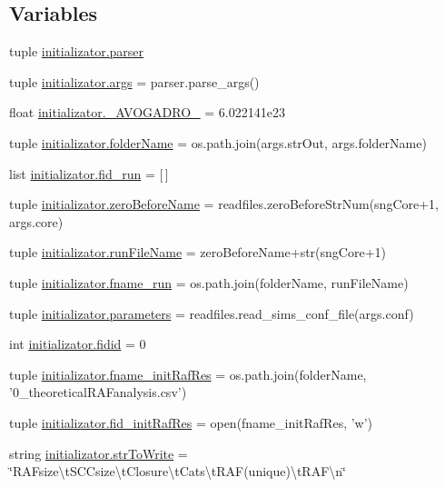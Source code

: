 \subsection*{Variables}
\begin{DoxyCompactItemize}
\item 
tuple \hyperlink{a00135_af2659789ba1896029e3ab9bfbf83d019}{initializator.\-parser}
\item 
tuple \hyperlink{a00135_aedb2e5b77a354ccd69d9d38b3c30f61a}{initializator.\-args} = parser.\-parse\-\_\-args()
\item 
float \hyperlink{a00135_a01b3b6a0972397f230c35bd2fb8effc4}{initializator.\-\_\-\-A\-V\-O\-G\-A\-D\-R\-O\-\_\-} = 6.\-022141e23
\item 
tuple \hyperlink{a00135_aa51c106700ef9afbdb94a1c800e10569}{initializator.\-folder\-Name} = os.\-path.\-join(args.\-str\-Out, args.\-folder\-Name)
\item 
list \hyperlink{a00135_a6015a676cc06fdae98b1cca15d92b883}{initializator.\-fid\-\_\-run} = \mbox{[}$\,$\mbox{]}
\item 
tuple \hyperlink{a00135_a475e51ace78f2490aa4206915d0e3ae6}{initializator.\-zero\-Before\-Name} = readfiles.\-zero\-Before\-Str\-Num(sng\-Core+1, args.\-core)
\item 
tuple \hyperlink{a00135_a47868487619848c8ead2458c6855426a}{initializator.\-run\-File\-Name} = zero\-Before\-Name+str(sng\-Core+1)
\item 
tuple \hyperlink{a00135_a6bc5100ec1c6492cec974172df243857}{initializator.\-fname\-\_\-run} = os.\-path.\-join(folder\-Name, run\-File\-Name)
\item 
tuple \hyperlink{a00135_a646de756d594b9a0eebf18c4eb9ee0d6}{initializator.\-parameters} = readfiles.\-read\-\_\-sims\-\_\-conf\-\_\-file(args.\-conf)
\item 
int \hyperlink{a00135_afdd976dc87dc056c8cba6926f9f98287}{initializator.\-fidid} = 0
\item 
tuple \hyperlink{a00135_a139a15a6b4127dd23049cb2b91a85d77}{initializator.\-fname\-\_\-init\-Raf\-Res} = os.\-path.\-join(folder\-Name, '0\-\_\-theoretical\-R\-A\-Fanalysis.\-csv')
\item 
tuple \hyperlink{a00135_a2f15742bdb2c2cebe65c8e9730915e28}{initializator.\-fid\-\_\-init\-Raf\-Res} = open(fname\-\_\-init\-Raf\-Res, 'w')
\item 
string \hyperlink{a00135_a2425798997b1c46c8bbed77ecffcaa9f}{initializator.\-str\-To\-Write} = \char`\"{}R\-A\-Fsize\textbackslash{}t\-S\-C\-Csize\textbackslash{}t\-Closure\textbackslash{}t\-Cats\textbackslash{}t\-R\-A\-F(unique)\textbackslash{}t\-R\-A\-F\textbackslash{}n\char`\"{}

\end{DoxyCompactItemize}
